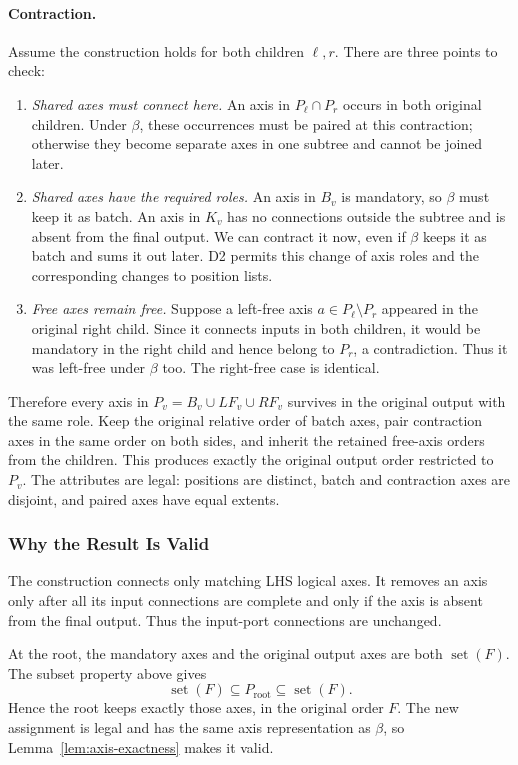 \paragraph{Contraction.}
Assume the construction holds for both children $\ell,r$.
There are three points to check:
\begin{enumerate}
\item \emph{Shared axes must connect here.}
An axis in $P_\ell\cap P_r$ occurs in both original children.
Under $\beta$, these occurrences must be paired at this contraction;
otherwise they become separate axes in one subtree and cannot be joined
later.
\item \emph{Shared axes have the required roles.}
An axis in $B_v$ is mandatory, so $\beta$ must keep it as batch.
An axis in $K_v$ has no connections outside the subtree and is absent
from the final output. We can contract it now, even if $\beta$ keeps
it as batch and sums it out later.
D2 permits this change of axis roles and the corresponding changes to
position lists.
\item \emph{Free axes remain free.}
Suppose a left-free axis $a\in P_\ell\setminus P_r$ appeared in the
original right child. Since it connects inputs in both children,
it would be mandatory in the right child and hence belong to $P_r$,
a contradiction. Thus it was left-free under $\beta$ too.
The right-free case is identical.
\end{enumerate}
Therefore every axis in $P_v=B_v\cup LF_v\cup RF_v$ survives in the
original output with the same role. Keep the original relative order
of batch axes, pair contraction axes in the same order on both sides,
and inherit the retained free-axis orders from the children.
This produces exactly the original output order restricted to $P_v$.
The attributes are legal: positions are distinct, batch and contraction
axes are disjoint, and paired axes have equal extents.

\subsubsection{Why the Result Is Valid}
The construction connects only matching LHS logical axes. It removes an
axis only after all its input connections are complete and only if the
axis is absent from the final output. Thus the input-port connections
are unchanged.

At the root, the mandatory axes and the original output axes are both
$\operatorname{set}(F)$. The subset property above gives
\begin{equation}
 \operatorname{set}(F)\subseteq P_{\mathrm{root}}
 \subseteq\operatorname{set}(F).
\end{equation}
Hence the root keeps exactly those axes, in the original order $F$.
The new assignment is legal and has the same axis representation as
$\beta$, so Lemma~\ref{lem:axis-exactness} makes it valid.
